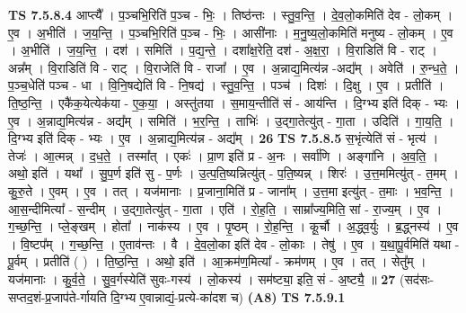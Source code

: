 \documentclass[17pt]{extarticle}
\begin{document}
                  \newline
                                \textbf{ TS 7.5.8.4} \newline
                  आप्त्यै᳚ । प॒ञ्चभि॒रिति॑ प॒ञ्च - भिः॒ । तिष्ठ॑न्तः । स्तु॒व॒न्ति॒ । दे॒व॒लो॒कमिति॑ देव - लो॒कम् । ए॒व । अ॒भीति॑ । ज॒य॒न्ति॒ । प॒ञ्चभि॒रिति॑ प॒ञ्च - भिः॒ । आसी॑नाः । म॒नु॒ष्य॒लो॒कमिति॑ मनुष्य - लो॒कम् । ए॒व । अ॒भीति॑ । ज॒य॒न्ति॒ । दश॑ । समिति॑ । प॒द्य॒न्ते॒ । दशा᳚क्ष॒रेति॒ दश॑ - अ॒क्ष॒रा॒ । वि॒राडिति॑ वि - राट् । अन्न᳚म् । वि॒राडिति॑ वि - राट् । वि॒राजेति॑ वि - राजा᳚ । ए॒व । अ॒न्नाद्य॒मित्य॑न्न -अद्य᳚म् । अवेति॑ । रु॒न्ध॒ते॒ । प॒ञ्च॒धेति॑ पञ्च - धा । वि॒नि॒षद्येति॑ वि - नि॒षद्य॑ । स्तु॒व॒न्ति॒ । पञ्च॑ । दिशः॑ । दि॒क्षु । ए॒व । प्रतीति॑ । ति॒ष्ठ॒न्ति॒ । एकै॑क॒येत्येक॑या - ए॒क॒या॒ । अस्तु॑तया । स॒माय॒न्तीति॑ सं - आय॑न्ति । दि॒ग्भ्य इति॑ दिक् - भ्यः । ए॒व । अ॒न्नाद्य॒मित्य॑न्न - अद्य᳚म् । समिति॑ । भ॒र॒न्ति॒ । ताभिः॑ । उ॒द्गा॒तेत्यु॑त् - गा॒ता । उदिति॑ । गा॒य॒ति॒ । दि॒ग्भ्य इति॑ दिक् - भ्यः । ए॒व । अ॒न्नाद्य॒मित्य॑न्न - अद्य᳚म् । \textbf{  26} \newline
                  \newline
                                \textbf{ TS 7.5.8.5} \newline
                  स॒भृंत्येति॑ सं - भृत्य॑ । तेजः॑ । आ॒त्मन्न् । द॒ध॒ते॒ । तस्मा᳚त् । एकः॑ । प्रा॒ण इति॑ प्र - अ॒नः । सर्वा॑णि । अङ्गा॑नि । अ॒व॒ति॒ । अथो॒ इति॑ । यथा᳚ । सु॒प॒र्ण इति॑ सु - प॒र्णः । उ॒त्प॒ति॒ष्यन्नित्यु॑त् - प॒ति॒ष्यन्न् । शिरः॑ । उ॒त्त॒ममित्यु॑त् - त॒मम् । कु॒रु॒ते । ए॒वम् । ए॒व । तत् । यज॑मानाः । प्र॒जाना॒मिति॑ प्र - जाना᳚म् । उ॒त्त॒मा इत्यु॑त् - त॒माः । भ॒व॒न्ति॒ । आ॒स॒न्दीमित्या᳚ - स॒न्दीम् । उ॒द्गा॒तेत्यु॑त् - गा॒ता । एति॑ । रो॒ह॒ति॒ । साम्रा᳚ज्य॒मिति॒ सां - रा॒ज्य॒म् । ए॒व । ग॒च्छ॒न्ति॒ । प्ले॒ङ्खम् । होता᳚ । नाक॑स्य । ए॒व । पृ॒ष्ठम् । रो॒ह॒न्ति॒ । कू॒र्चौ । अ॒द्ध्व॒र्युः । ब्र॒द्ध्नस्य॑ । ए॒व । वि॒ष्टप᳚म् । ग॒च्छ॒न्ति॒ । ए॒ताव॑न्तः । वै । दे॒व॒लो॒का इति॑ देव - लो॒काः । तेषु॑ । ए॒व । य॒था॒पू॒र्वमिति॑ यथा - पू॒र्वम् । प्रतीति॑ ( ) । ति॒ष्ठ॒न्ति॒ । अथो॒ इति॑ । आ॒क्रम॑ण॒मित्या᳚ - क्रम॑णम् । ए॒व । तत् । सेतु᳚म् । यज॑मानाः । कु॒र्व॒ते॒ । सु॒व॒र्गस्येति॑ सुवः-गस्य॑ । लो॒कस्य॑ । सम॑ष्ट्या॒ इति॒ सं - अ॒ष्ट्यै॒ ॥ \textbf{  27} \newline
                  \newline
                      (सद॑सः-सप्तद॒शं-प्र॒जाप॑ते-र्गायति दि॒ग्भ्य ए॒वान्नाद्यं॒-प्रत्ये-का॑दश च)  \textbf{(A8)} \newline \newline
                                \textbf{ TS 7.5.9.1} \newline
\end{document}
